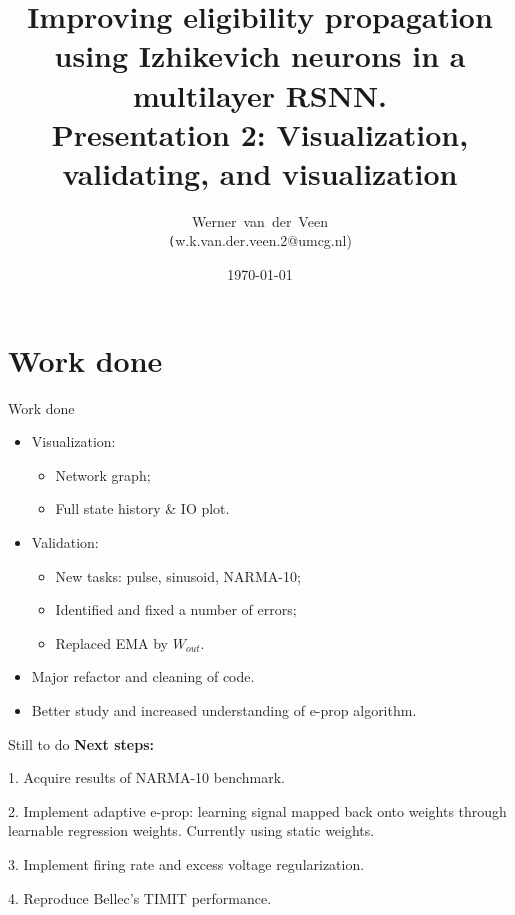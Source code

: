 \documentclass[t]{beamer}
\title[Eligibility propagation]{Improving eligibility propagation using Izhikevich neurons in a multilayer RSNN.\\\vspace{10pt}
\large{Presentation 2: Visualization, validating, and visualization}}
\author[Werner]{Werner~van~der~Veen\\\tiny\texttt({w.k.van.der.veen.2@umcg.nl})}\date{\today}
\begin{document}
\begin{frame}
    \titlepage
\end{frame}


\small
\section{Work done}

\begin{frame}{Work done}
	\begin{itemize}
		\item Visualization:
			\begin{itemize}
				\item Network graph;
				\item Full state history \& IO plot.
			\end{itemize}
		\item Validation:
			\begin{itemize}
				\item New tasks: pulse, sinusoid, NARMA-10;
				\item Identified and fixed a number of errors;
				\item Replaced EMA by $W_{out}$.
				
			\end{itemize}
		\item Major refactor and cleaning of code.
		\item Better study and increased understanding of e-prop algorithm.
	\end{itemize}
\end{frame}

\begin{frame}{Still to do}
    \textbf{Next steps:}
    
    1. Acquire results of NARMA-10 benchmark.
    
    2. Implement adaptive e-prop: learning signal mapped back onto weights through learnable regression weights. Currently using static weights.
    
    3. Implement firing rate and excess voltage regularization.
    
    4. Reproduce Bellec's TIMIT performance.
\end{frame}
\end{document}
